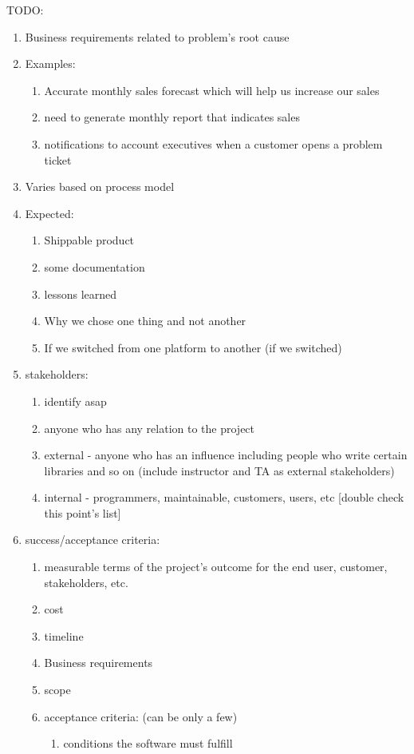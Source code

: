 \documentclass[11pt]{article}
\begin{document}
    TODO:

    \begin{enumerate}
        \item Business requirements related to problem's root cause
        \item Examples:
        \begin{enumerate}
            \item Accurate monthly sales forecast which will help us increase our sales
            \item need to generate monthly report that indicates sales
            \item notifications to account executives when a customer opens a problem ticket
        \end{enumerate}
        \item Varies based on process model
        \item Expected:
        \begin{enumerate}
            \item Shippable product
            \item some documentation
            \item lessons learned
            \item Why we chose one thing and not another
            \item If we switched from one platform to another (if we switched)
        \end{enumerate}
        \item stakeholders:
        \begin{enumerate}
            \item identify asap
            \item anyone who has any relation to the project
            \item external - anyone who has an influence\; including people who write certain libraries and so on  (include instructor and TA as external stakeholders)
            \item internal - programmers, maintainable, customers, users, etc [double check this point's list]
        \end{enumerate}
        \item success/acceptance criteria:
        \begin{enumerate}
            \item measurable terms of the project's outcome for the end user, customer, stakeholders, etc.
            \item cost
            \item timeline
            \item Business requirements
            \item scope
            \item acceptance criteria: (can be only a few)
            \begin{enumerate}
                \item conditions the software must fulfill
            \end{enumerate}
        \end{enumerate}
    \end{enumerate}
\end{document}
